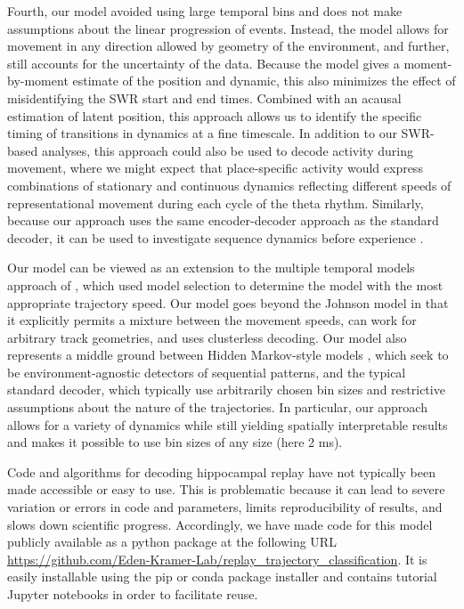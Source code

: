 \documentclass[9pt,lineno]{elife}
\begin{document}
Fourth, our model avoided using large temporal bins and does not make assumptions about the linear progression of events. Instead, the model allows for movement in any direction allowed by geometry of the environment, and further, still accounts for the uncertainty of the data. Because the model gives a moment-by-moment estimate of the position and dynamic, this also minimizes the effect of misidentifying the SWR start and end times. Combined with an acausal estimation of latent position, this approach allows us to identify the specific timing of transitions in dynamics at a fine timescale. In addition to our SWR-based analyses, this approach could also be used to decode activity during movement, where we might expect that place-specific activity would express combinations of stationary and continuous dynamics reflecting different speeds of representational movement during each cycle of the theta rhythm. Similarly, because our approach uses the same encoder-decoder approach as the standard decoder, it can be used to investigate sequence dynamics before experience \citep{DragoiDistinctpreplaymultiple2013}.

Our model can be viewed as an extension to the multiple temporal models approach of \cite{JohnsonMeasuringdistributedproperties2008}, which used model selection to determine the model with the most appropriate trajectory speed. Our model goes beyond the Johnson model in that it explicitly permits a mixture between the movement speeds, can work for arbitrary track geometries, and uses clusterless decoding. Our model also represents a middle ground between Hidden Markov-style models \citep{ChenUncoveringspatialtopology2012, ChenBayesiannonparametricmethods2016, LindermanBayesiannonparametricapproach2016, MaboudiUncoveringtemporalstructure2018}, which seek to be environment-agnostic detectors of sequential patterns, and the typical standard decoder, which typically use arbitrarily chosen bin sizes and restrictive assumptions about the nature of the trajectories. In particular, our approach allows for a variety of dynamics while still yielding spatially interpretable results and makes it possible to use bin sizes of any size (here 2 ms).

Code and algorithms for decoding hippocampal replay have not typically been made accessible or easy to use. This is problematic because it can lead to severe variation or errors in code and parameters, limits reproducibility of results, and slows down scientific progress. Accordingly, we have made code for this model publicly available as a python package at the following URL \url{https://github.com/Eden-Kramer-Lab/replay_trajectory_classification}. It is easily installable using the pip or conda package installer and contains tutorial Jupyter notebooks in order to facilitate reuse.
\end{document}
